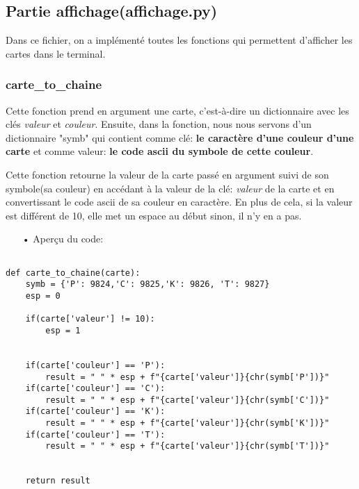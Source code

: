 	\subsection{Partie affichage(affichage.py)}
	Dans ce fichier, on a implémenté toutes les fonctions qui permettent d'afficher les cartes dans le terminal.

	\subsubsection{carte\_to\_chaine}
	Cette fonction prend en argument une carte, c'est-à-dire un dictionnaire avec les clés \emph{valeur} et \emph{couleur}. Ensuite, dans la fonction, nous nous servons d'un dictionnaire "symb" qui contient comme clé: \textbf{le caractère d'une couleur d'une carte}  et comme valeur: \textbf{le code ascii du symbole de cette couleur}.
	\\
	\par Cette fonction retourne la valeur de la carte passé en argument suivi de son symbole(sa couleur) en accédant à la valeur de la clé: \emph{valeur} de la carte et en convertissant le code ascii de sa couleur en caractère. En plus de cela, si la valeur est différent de 10, elle met un espace au début sinon, il n'y en a pas.
	\\
	\begin{itemize}
	\color{blue}\item[•]Aperçu du code:
	\end{itemize}
	
	\lstset{language=Python}
	\lstset{frame=lines}
	\lstset{basicstyle=\footnotesize}
	\begin{lstlisting}
		
def carte_to_chaine(carte):
    symb = {'P': 9824,'C': 9825,'K': 9826, 'T': 9827}
    esp = 0

    if(carte['valeur'] != 10):
        esp = 1
    
    
    if(carte['couleur'] == 'P'):
        result = " " * esp + f"{carte['valeur']}{chr(symb['P'])}"
    if(carte['couleur'] == 'C'):
        result = " " * esp + f"{carte['valeur']}{chr(symb['C'])}"
    if(carte['couleur'] == 'K'):
        result = " " * esp + f"{carte['valeur']}{chr(symb['K'])}"
    if(carte['couleur'] == 'T'):
        result = " " * esp + f"{carte['valeur']}{chr(symb['T'])}"
    
    
    return result
	\end{lstlisting}
	
	
